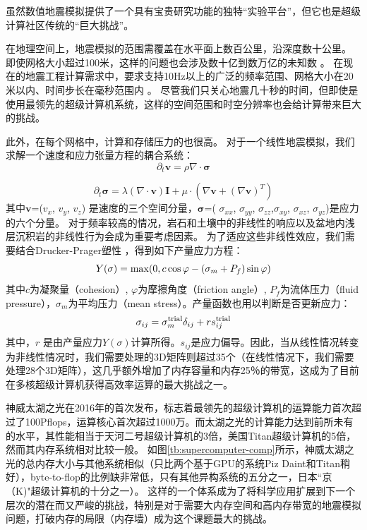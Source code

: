 \documentclass[degree=doctor]{thuthesis}
\begin{document}
虽然数值地震模拟提供了一个具有宝贵研究功能的独特“实验平台”，但它也是超级计算社区传统的“巨大挑战”。

在地理空间上，地震模拟的范围需覆盖在水平面上数百公里，沿深度数十公里。 即使网格大小超过100米，这样的问题也会涉及数十亿到数万亿的未知数 \citep{cui2010scalable}。 在现在的地震工程计算需求中，要求支持10Hz以上的广泛的频率范围、网格大小在20米以内、时间步长在毫秒范围内  \citep{cui2013physics}。 尽管我们只关心地震几十秒的时间，但即使是使用最领先的超级计算机系统，这样的空间范围和时空分辨率也会给计算带来巨大的挑战。

此外，在每个网格中，计算和存储压力的也很高。 对于一个线性地震模拟，我们求解一个速度和应力张量方程的耦合系统：
\begin{equation}
\partial_{t}\bm{v}=\rho\nabla\cdot\bm{\sigma}
\end{equation}

\begin{equation}
  \partial_{t}  \bm{\sigma} = \lambda (\nabla    \cdot \bm{v}) \bm{I} + \mu \cdot (\nabla \bm{v}  + (\nabla \bm{v})^{T})
\end{equation}
其中$\bm{v}$=({$v_{x}$}, {$v_{y}$}, {$v_{z}$}) 是速度的三个空间分量，$\bm{\sigma}$=( $\sigma_{xx}$, $\sigma_{yy}$, $\sigma_{zz}$,$\sigma_{xy}$, $\sigma_{xz}$, $\sigma_{yz}$)是应力的六个分量。 对于频率较高的情况，岩石和土壤中的非线性的响应以及盆地内浅层沉积岩的非线性行为会成为重要考虑因素。 为了适应这些非线性效应，我们需要结合Drucker-Prager塑性 \citep {roten2016high}，得到如下产量应力方程：
\begin{equation}
Y(\sigma)={\rm max}(0, c \cos \varphi - ( \sigma_{m} + P_{f} ) \sin\varphi)
\end{equation}
其中$c$为凝聚量（cohesion）, $\varphi$为摩擦角度（friction angle）, $P_{f}$为流体压力（fluid
pressure），$\sigma_{m}$为平均压力（mean stress）。产量函数也用以判断是否更新应力：
\begin{equation}
\sigma_{ij} = \sigma_{m}^{\rm trial} \delta_{ij} + r s_{ij}^{\rm{trial}}
\end{equation}
其中，$r$ 是由产量应力$Y(\sigma)$计算所得。$s_{ij}$是应力偏导。因此，当从线性情况转变为非线性情况时，我们需要处理的3D矩阵则超过35个（在线性情况下，我们需要处理28个3D矩阵）\citep {roten2016high}，这几乎额外增加了内存容量和内存25％的带宽，这成为了目前在多核超级计算机获得高效率运算的最大挑战之一。

神威太湖之光在2016年的首次发布\citep{fu2016sunway}，标志着最领先的超级计算机的运算能力首次超过了100Pflops，运算核心首次超过1000万。而太湖之光的计算能力达到前所未有的水平，其性能相当于天河二号超级计算机的3倍，美国Titan超级计算机的5倍，然而其内存系统相对比较一般。 如图\ref{tb:supercomputer-comp}所示，神威太湖之光的总内存大小与其他系统相似（只比两个基于GPU的系统Piz Daint和Titan稍好），byte-to-flop的比例缺非常低，只有其他异构系统的五分之一，日本“京（K)"超级计算机的十分之一）。 这样的一个体系成为了将科学应用扩展到下一个层次的潜在而又严峻的挑战，特别是对于需要大内存空间和高内存带宽的地震模拟问题，打破内存的局限（内存墙）成为这个课题最大的挑战。
\end{document}
